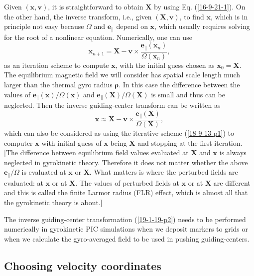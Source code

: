 \documentclass{llncs}
\newcommand{\tmmathbf}[1]{\ensuremath{\boldsymbol{#1}}}
\begin{document}
Given $(\mathbf{x}, \mathbf{v})$, it is straightforward to obtain $\mathbf{X}$
by using Eq. (\ref{16-9-21-1}). On the other hand, the inverse transform,
i.e., given $(\mathbf{X}, \mathbf{v})$, to find $\mathbf{x}$, which is in
principle not easy because $\Omega$ and $\mathbf{e}_{\parallel}$ depend on
$\mathbf{x}$, which usually requires solving for the root of a nonlinear
equation. Numerically, one can use
\begin{equation}
  \label{18-9-13-p1} \mathbf{x}_{n + 1} =\mathbf{X}-\mathbf{v} \times
  \frac{\tmmathbf{e}_{\parallel} (\mathbf{x}_n)}{\Omega (\mathbf{x}_n)},
\end{equation}
as an iteration scheme to compute $\mathbf{x}$, with the initial guess chosen
as $\mathbf{x}_0 =\mathbf{X}$. The equilibrium magnetic field we will consider
has spatial scale length much larger than the thermal gyro radius
$\tmmathbf{\rho}$. In this case the difference between the values of
$\mathbf{e}_{\parallel} (\mathbf{x}) / \Omega (\mathbf{x})$ and
$\mathbf{e}_{\parallel} (\mathbf{X}) / \Omega (\mathbf{X})$ is small and thus
can be neglected. Then the inverse guiding-center transform can be written as
\begin{equation}
  \label{19-1-19-p2} \mathbf{x} \approx \mathbf{X}-\mathbf{v} \times
  \frac{\tmmathbf{e}_{\parallel} (\mathbf{X})}{\Omega (\mathbf{X})},
\end{equation}
which can also be considered as using the iterative scheme (\ref{18-9-13-p1})
to computer $\mathbf{x}$ with initial guess of $\mathbf{x}$ being $\mathbf{X}$
and stopping at the first iteration. [The difference between equilibrium field
values evaluated at $\mathbf{X}$ and $\mathbf{x}$ is always neglected in
gyrokinetic theory. Therefore it does not matter whether the above
$\mathbf{e}_{\parallel} / \Omega$ is evaluated at $\mathbf{x}$ or
$\mathbf{X}$. What matters is where the perturbed fields are evaluated: at
$\mathbf{x}$ or at $\mathbf{X}$. The values of perturbed fields at
$\mathbf{x}$ or at $\mathbf{X}$ are different and this is called the finite
Larmor radius (FLR) effect, which is almost all that the gyrokinetic theory is
about.]

The inverse guiding-center transformation (\ref{19-1-19-p2}) needs to be
performed numerically in gyrokinetic PIC simulations when we deposit markers
to grids or when we calculate the gyro-averaged field to be used in pushing
guiding-centers.

\subsection{Choosing velocity coordinates}
\end{document}
